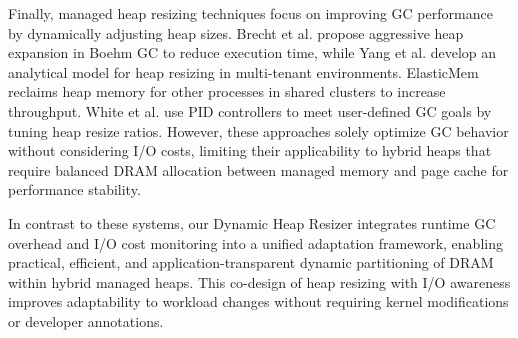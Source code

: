 Finally, managed heap resizing techniques focus on improving GC performance by dynamically adjusting heap sizes. Brecht et al. \cite{brecht} propose aggressive heap expansion in Boehm GC to reduce execution time, while Yang et al. \cite{yang} develop an analytical model for heap resizing in multi-tenant environments. ElasticMem \cite{elasticmem} reclaims heap memory for other processes in shared clusters to increase throughput. White et al. \cite{white} use PID controllers to meet user-defined GC goals by tuning heap resize ratios. However, these approaches solely optimize GC behavior without considering I/O costs, limiting their applicability to hybrid heaps that require balanced DRAM allocation between managed memory and page cache for performance stability.

In contrast to these systems, our Dynamic Heap Resizer integrates runtime GC overhead and I/O cost monitoring into a unified adaptation framework, enabling practical, efficient, and application-transparent dynamic partitioning of DRAM within hybrid managed heaps. This co-design of heap resizing with I/O awareness improves adaptability to workload changes without requiring kernel modifications or developer annotations.



